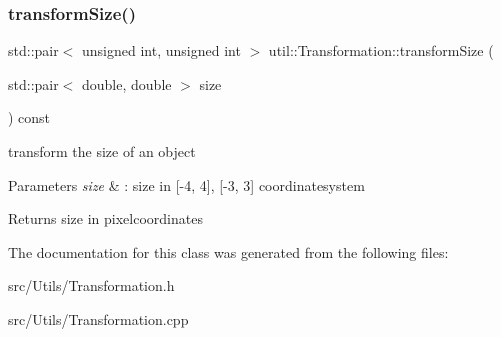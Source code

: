 \subsubsection{\texorpdfstring{transform\+Size()}{transformSize()}\hspace{0.1cm}{\footnotesize\ttfamily [2/2]}}
{\footnotesize\ttfamily std\+::pair$<$ unsigned int, unsigned int $>$ util\+::\+Transformation\+::transform\+Size (\begin{DoxyParamCaption}\item[{std\+::pair$<$ double, double $>$}]{size }\end{DoxyParamCaption}) const}

transform the size of an object 
\begin{DoxyParams}{Parameters}
{\em size} & \+: size in \mbox{[}-\/4, 4\mbox{]}, \mbox{[}-\/3, 3\mbox{]} coordinatesystem \\
\hline
\end{DoxyParams}
\begin{DoxyReturn}{Returns}
size in pixelcoordinates 
\end{DoxyReturn}


The documentation for this class was generated from the following files\+:\begin{DoxyCompactItemize}
\item 
src/\+Utils/Transformation.\+h\item 
src/\+Utils/Transformation.\+cpp\end{DoxyCompactItemize}
